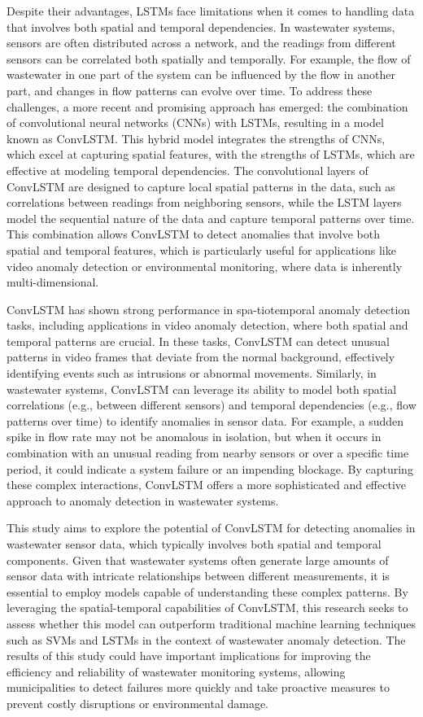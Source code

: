 \documentclass[conference]{IEEEtran}
\begin{document}
Despite their advantages, LSTMs face limitations when it comes to handling data that involves both spatial and temporal dependencies. In wastewater systems, sensors are often distributed across a network, and the readings from different sensors can be correlated both spatially and temporally. For example, the flow of wastewater in one part of the system can be influenced by the flow in another part, and changes in flow patterns can evolve over time. To address these challenges, a more recent and promising approach has emerged: the combination of convolutional neural networks (CNNs) with LSTMs, resulting in a model known as ConvLSTM. This hybrid model integrates the strengths of CNNs, which excel at capturing spatial features, with the strengths of LSTMs, which are effective at modeling temporal dependencies. The convolutional layers of ConvLSTM are designed to capture local spatial patterns in the data, such as correlations between readings from neighboring sensors, while the LSTM layers model the sequential nature of the data and capture temporal patterns over time. This combination allows ConvLSTM to detect anomalies that involve both spatial and temporal features, which is particularly useful for applications like video anomaly detection or environmental monitoring, where data is inherently multi-dimensional.

ConvLSTM has shown strong performance in spa-tiotemporal anomaly detection tasks, including applications in video anomaly detection, where both spatial and temporal patterns are crucial. In these tasks, ConvLSTM can detect unusual patterns in video frames that deviate from the normal background, effectively identifying events such as intrusions or abnormal movements. Similarly, in wastewater systems, ConvLSTM can leverage its ability to model both spatial correlations (e.g., between different sensors) and temporal dependencies (e.g., flow patterns over time) to identify anomalies in sensor data. For example, a sudden spike in flow rate may not be anomalous in isolation, but when it occurs in combination with an unusual reading from nearby sensors or over a specific time period, it could indicate a system failure or an impending blockage. By capturing these complex interactions, ConvLSTM offers a more sophisticated and effective approach to anomaly detection in wastewater systems.

This study aims to explore the potential of ConvLSTM for detecting anomalies in wastewater sensor data, which typically involves both spatial and temporal components. Given that wastewater systems often generate large amounts of sensor data with intricate relationships between different measurements, it is essential to employ models capable of understanding these complex patterns. By leveraging the spatial-temporal capabilities of ConvLSTM, this research seeks to assess whether this model can outperform traditional machine learning techniques such as SVMs and LSTMs in the context of wastewater anomaly detection. The results of this study could have important implications for improving the efficiency and reliability of wastewater monitoring systems, allowing municipalities to detect failures more quickly and take proactive measures to prevent costly disruptions or environmental damage.
\end{document}
